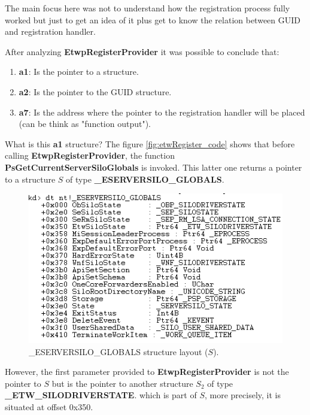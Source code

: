   The main focus here was not to understand how the registration process fully worked but just to get an idea of it plus get to know the relation between GUID and registration handler.

  After analyzing  {\bfseries EtwpRegisterProvider} it was possible to conclude that:
  \begin{enumerate}
\setlength\itemsep{0.05em}
  \item {\bfseries a1}: Is the pointer to a structure.
  \item {\bfseries a2}: Is the pointer to the GUID structure. 
  \item {\bfseries a7}: Is the address where the pointer to the registration handler will be placed (can be think as "function output").
  \end{enumerate}

  What is this {\bfseries a1} structure?
  The figure \ref{fig:etwRegister_code} shows that before calling {\bfseries EtwpRegisterProvider}, the function {\bfseries PsGetCurrentServerSiloGlobals} is invoked. This latter one returns a pointer to a structure $S$ of type {\bfseries \_ESERVERSILO\_GLOBALS}. 

  \begin{centering}
  \begin{figure}[H]
    \includegraphics[width=12cm]{images/ESILOGLOBALS_structure.png}
    \caption[]{\_ESERVERSILO\_GLOBALS structure layout ($S$).}
    \label{fig:eserversilo_globals_structure}
  \end{figure}
  \end{centering}

  However, the first parameter provided to {\bfseries EtwpRegisterProvider} is not the pointer to $S$ but is the pointer to another structure $S_2$ of type {\bfseries \_ETW\_SILODRIVERSTATE}. which is part of $S$, more precisely, it is situated at offset 0x350. 

